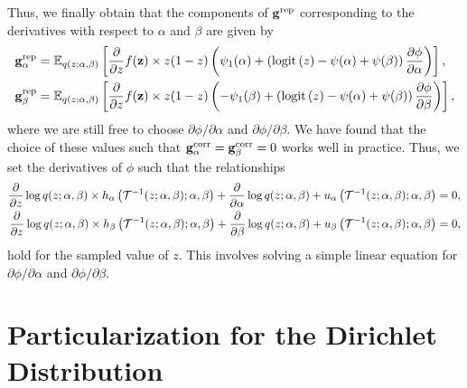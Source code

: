 \documentclass{article}
\begin{document}
Thus, we finally obtain that the components of $\mathbf{g}^{\textrm{rep}}$ corresponding to the derivatives with respect to $\alpha$ and $\beta$ are given by
\begin{align}
    & \mathbf{g}^{\textrm{rep}}_{\alpha} = \mathbb{E}_{q(z;\alpha,\beta)}\left[\frac{\partial}{\partial z}f(\mathbf{z}) \times z(1-z)\left( \psi_1(\alpha) + \left(\textrm{logit}\left(z\right)-\psi(\alpha)+\psi(\beta)\right)\frac{\partial\phi}{\partial\alpha} \right)\right],\\
    & \mathbf{g}^{\textrm{rep}}_{\beta} = \mathbb{E}_{q(z;\alpha,\beta)}\left[\frac{\partial}{\partial z}f(\mathbf{z}) \times z(1-z)\left( -\psi_1(\beta) + \left(\textrm{logit}\left(z\right)-\psi(\alpha)+\psi(\beta)\right)\frac{\partial\phi}{\partial\beta} \right)\right],
\end{align}
where we are still free to choose $\partial\phi/\partial\alpha$ and $\partial\phi/\partial\beta$. We have found that the choice of these values such that $\mathbf{g}^{\textrm{corr}}_{\alpha} = \mathbf{g}^{\textrm{corr}}_{\beta} = 0$ works well in practice. Thus, we set the derivatives of $\phi$ such that the relationships
\begin{align}
    \frac{\partial}{\partial z}\log q(z;\alpha,\beta) \times h_{\alpha}\left(\mathcal{T}^{-1}(z;\alpha,\beta);\alpha,\beta \right) + \frac{\partial}{\partial \alpha}\log q(z;\alpha,\beta) + u_{\alpha}\left(\mathcal{T}^{-1}(z;\alpha,\beta);\alpha,\beta \right) = 0,\\
    \frac{\partial}{\partial z}\log q(z;\alpha,\beta) \times h_{\beta}\left(\mathcal{T}^{-1}(z;\alpha,\beta);\alpha,\beta \right) + \frac{\partial}{\partial \beta}\log q(z;\alpha,\beta) + u_{\beta}\left(\mathcal{T}^{-1}(z;\alpha,\beta);\alpha,\beta \right) = 0,
\end{align}
hold for the sampled value of $z$. This involves solving a simple linear equation for $\partial\phi/\partial\alpha$ and $\partial\phi/\partial\beta$.

\section{Particularization for the Dirichlet Distribution}
\end{document}
